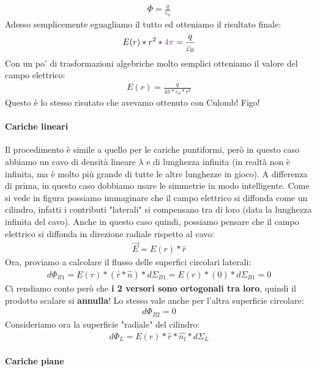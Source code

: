                     \begin{align*}
                        \Phi = \frac{q}{\varepsilon_0}
                    \end{align*}
                    Adesso semplicemente eguagliamo il tutto ed otteniamo il risultato finale:
                    \begin{align*}
                        E(r)*r^2*\textcolor{Purple}{4\pi} = \frac{q}{\varepsilon_0}
                    \end{align*}
                    Con un po' di trasformazioni algebriche molto semplici otteniamo il valore del campo elettrico:
                    \begin{align*}
                        E(r)= \frac{q}{4\pi*\varepsilon_0*r^2}
                    \end{align*}
                    Questo è lo stesso risutato che avevamo ottenuto con Culomb! Figo!

                \paragraph{Cariche lineari}
                    Il procedimento è simile a quello per le cariche puntiformi, però in questo caso abbiamo un cavo di densità lineare $\lambda$ e di lunghezza infinita (in realtà non è infinita, ma è molto più grande di tutte le altre lunghezze in gioco). A differenza di prima, in questo caso dobbiamo usare le simmetrie in modo intelligente.
                    Come si vede in figura possiamo immaginare che il campo elettrico si diffonda come un cilindro, infatti i contributi "laterali" si compensano tra di loro (data la lunghezza infinita del cavo). Anche in questo caso quindi, possiamo pensare che il campo elettrico si diffonda in direzione radiale rispetto al cavo:
                    \begin{align*}
                        \vec{E}=E(r)*\hat{r}
                    \end{align*}
                    Ora, proviamo a calcolare il flusso delle superfici circolari laterali:
                    \begin{align*}
                        d\Phi_{B1}= E(r)*(\hat{r}*\hat{n})*d\Sigma_{B1} = E(r)*(0)*d\Sigma_{B1} = 0
                    \end{align*}
                    Ci rendiamo conto però che \textbf{i 2 versori sono ortogonali tra loro}, quindi il prodotto scalare si \textbf{annulla}! Lo stesso vale anche per l'altra superficie circolare:
                    \begin{align*}
                        d\Phi_{B2} = 0
                    \end{align*}
                    Consideriamo ora la superficie "radiale" del cilindro:
                    \begin{align*}
                        d\Phi_{L} = E(r)*\hat{r}*\hat{n_l}*d\Sigma_L
                    \end{align*}
                \paragraph{Cariche piane}